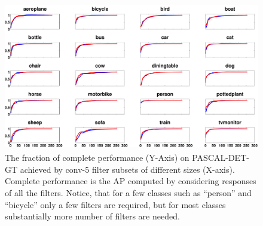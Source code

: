 \begin{figure}[t!]
\centering
\includegraphics[height=6.5cm]{images/pool5_spmax_num_svm_filters.pdf}
\caption{ The fraction of complete performance (Y-Axis) on PASCAL-DET-GT achieved by conv-5 filter subsets of different sizes (X-axis). Complete performance is the AP computed by considering responses of all the filters. Notice, that for a few classes such as ``person'' and ``bicycle'' only a few filters are required, but for most classes substantially more number of filters are needed.}
\label{fig:svm-sel-dims}
\end{figure}  

\setlength{\tabcolsep}{1pt}
\begin{table}[t!]
\renewcommand{\arraystretch}{1.2}
\begin{center}
\caption{Number of filters required to achieve 50\%, 90\% of the complete performance on PASCAL-DET-GT using a CNN pre-trained on Imagenet and fine-tuned for PASCAL-DET using conv-5 features.}
\label{table:num-fil}
\end{center}
\end{table}
\setlength{\tabcolsep}{1.4pt}
  
